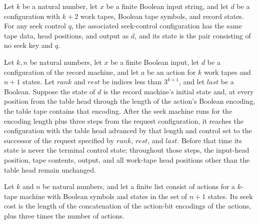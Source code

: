 \begin{definition}
\label{Turing.StepBlock.seekCfg}
\leanok
{}
Let $k$ be a natural number, let $x$ be a finite Boolean input string, and let $d$ be a
configuration with $k+2$ work tapes, Boolean tape symbols, and record states. For any
seek control $q$, the associated seek-control configuration has the same tape data, head
positions, and output as $d$, and its state is the pair consisting of no seek key and
$q$.
\end{definition}

\begin{lemma}
\label{Turing.StepBlock.seekTM_request}
\leanok
{}
Let $k,n$ be natural numbers, let $x$ be a finite Boolean input, let $d$ be a
configuration of the record machine, and let $a$ be an action for $k$ work tapes and
$n+1$ states. Let $rank$ and $rest$ be indices less than $3^{k+1}$, and let $last$ be a
Boolean. Suppose the state of $d$ is the record machine's initial state and, at every
position from the table head through the length of the action's Boolean encoding, the
table tape contains that encoding. After the seek machine runs for the encoding length
plus three steps from the request configuration, it reaches the configuration with the
table head advanced by that length and control set to the successor of the request
specified by $rank$, $rest$, and $last$. Before that time its state is never the
terminal control state; throughout those steps, the input-head position, tape contents,
output, and all work-tape head positions other than the table head remain unchanged.
\end{lemma}

\begin{definition}
\label{Turing.StepBlock.seekCost}
\leanok
{}
Let $k$ and $n$ be natural numbers, and let a finite list consist of actions for a
$k$-tape machine with Boolean symbols and states in the set of $n+1$ states. Its seek
cost is the length of the concatenation of the action-bit encodings of the actions, plus
three times the number of actions.
\end{definition}

